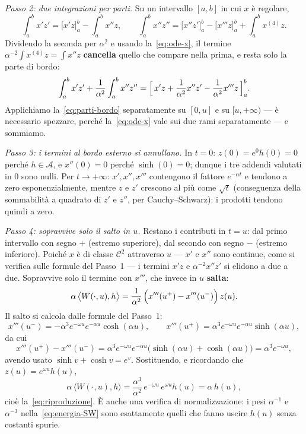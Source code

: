 \documentclass[11pt,a4paper]{article}
\theoremstyle{plain}
\theoremstyle{definition}
\theoremstyle{remark}
\begin{document}
\emph{Passo 2: due integrazioni per parti.} Su un intervallo $[a,b]$ in cui $x$ \`e regolare,
\[
  \int_a^b x'z' = \bigl[x'z\bigr]_a^b - \int_a^b x''z,
  \qquad
  \int_a^b x''z'' = \bigl[x''z'\bigr]_a^b - \bigl[x'''z\bigr]_a^b + \int_a^b x^{(4)}z .
\]
Dividendo la seconda per $\alpha^{2}$ e usando la~\eqref{eq:ode-x}, il termine
$\alpha^{-2}\!\int x^{(4)}z = \int x''z$ \textbf{cancella} quello che compare nella prima, e
resta solo la parte di bordo:
\begin{equation}
  \int_a^b x'z' + \frac{1}{\alpha^{2}}\int_a^b x''z''
  = \Bigl[\,x'z + \frac{1}{\alpha^{2}}x''z' - \frac{1}{\alpha^{2}}x'''z\,\Bigr]_a^b .
  \label{eq:parti-bordo}
\end{equation}
Applichiamo la~\eqref{eq:parti-bordo} separatamente su $[0,u]$ e su $[u,+\infty)$ --- \`e
necessario spezzare, perch\'e la~\eqref{eq:ode-x} vale sui due rami separatamente --- e
sommiamo.

\emph{Passo 3: i termini al bordo esterno si annullano.} In $t=0$: $z(0)=e^{0}h(0)=0$ perch\'e
$h\in\mathcal{A}$, e $x''(0)=0$ perch\'e $\sinh(0)=0$; dunque i tre addendi
valutati in $0$ sono nulli. Per $t\to+\infty$: $x',x'',x'''$ contengono il fattore
$e^{-\alpha t}$ e tendono a zero esponenzialmente, mentre $z$ e $z'$ crescono al pi\`u come
$\sqrt{t}$ (conseguenza della sommabilit\`a a quadrato di $z'$ e $z''$, per
Cauchy--Schwarz): i prodotti tendono quindi a zero.

\emph{Passo 4: sopravvive solo il salto in $u$.} Restano i contributi in $t=u$: dal primo
intervallo con segno $+$ (estremo superiore), dal secondo con segno $-$ (estremo inferiore).
Poich\'e $x$ \`e di classe $\mathcal{C}^2$ attraverso $u$ --- $x'$ e $x''$ sono continue, come
si verifica sulle formule del Passo~1 --- i termini $x'z$ e $\alpha^{-2}x''z'$ si elidono a
due a due. Sopravvive solo il termine con $x'''$, che invece in $u$ \textbf{salta}:
\[
  \alpha\,\bigl\langle W(\cdot,u),h \bigr\rangle
  = \frac{1}{\alpha^{2}}\,\Bigl(x'''(u^{+}) - x'''(u^{-})\Bigr)\,z(u).
\]
Il salto si calcola dalle formule del Passo~1:
\[
  x'''(u^{-}) = -\alpha^{3}e^{-\omega u}e^{-\alpha u}\cosh(\alpha u),
  \qquad
  x'''(u^{+}) = \alpha^{3}e^{-\omega u}e^{-\alpha u}\sinh(\alpha u),
\]
da cui
\begin{equation}
  x'''(u^{+}) - x'''(u^{-})
  = \alpha^{3}e^{-\omega u}e^{-\alpha u}\bigl(\sinh(\alpha u)+\cosh(\alpha u)\bigr)
  = \alpha^{3}e^{-\omega u},
  \label{eq:salto-terza}
\end{equation}
avendo usato $\sinh v + \cosh v = e^{v}$. Sostituendo, e ricordando che
$z(u)=e^{\omega u}h(u)$,
\[
  \alpha\,\bigl\langle W(\cdot,u),h \bigr\rangle
  = \frac{\alpha^{3}}{\alpha^{2}}\,e^{-\omega u}\,e^{\omega u}h(u) = \alpha\,h(u),
\]
cio\`e la~\eqref{eq:riproduzione}. \`E anche una verifica di normalizzazione: i pesi
$\alpha^{-1}$ e $\alpha^{-3}$ nella~\eqref{eq:energia-SW} sono esattamente quelli che fanno
uscire $h(u)$ senza costanti spurie.
\end{document}
